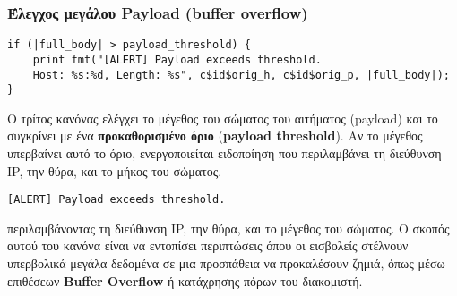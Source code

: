 \subsubsection{Έλεγχος μεγάλου Payload (buffer overflow)}
\begin{lstlisting}
if (|full_body| > payload_threshold) {
    print fmt("[ALERT] Payload exceeds threshold. 
    Host: %s:%d, Length: %s", c$id$orig_h, c$id$orig_p, |full_body|);
}
\end{lstlisting}
Ο τρίτος κανόνας ελέγχει το μέγεθος του σώματος του αιτήματος (payload) και το συγκρίνει με ένα \textbf{προκαθορισμένο όριο} (\textbf{payload threshold}). Αν το μέγεθος υπερβαίνει αυτό το όριο, ενεργοποιείται ειδοποίηση που περιλαμβάνει τη διεύθυνση IP, την θύρα, και το μήκος του σώματος.
\begin{lstlisting}
[ALERT] Payload exceeds threshold.
\end{lstlisting}
περιλαμβάνοντας τη διεύθυνση IP, την θύρα, και το μέγεθος του σώματος.
Ο σκοπός αυτού του κανόνα είναι να εντοπίσει περιπτώσεις όπου οι εισβολείς στέλνουν υπερβολικά μεγάλα δεδομένα σε μια προσπάθεια να προκαλέσουν ζημιά, όπως μέσω επιθέσεων \textbf{Βuffer Οverflow} ή κατάχρησης πόρων του διακομιστή.
